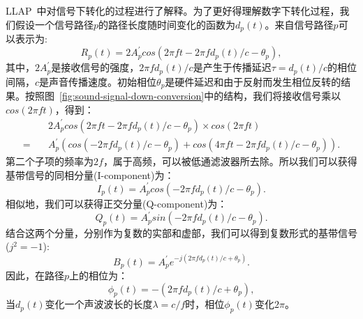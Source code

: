 LLAP~\cite{wang2016device}中对信号下转化的过程进行了解释。为了更好得理解数字下转化过程，我们假设一个信号路径$p$的路径长度随时间变化的函数为$d_p\left( t\right)$。来自信号路径$p$可以表示为:
$$
R_{p}\left( t\right) = 2A^{'}_{p}cos \left( 2\pi ft - 2\pi fd_{p}\left( t \right) / c - \theta_{p} \right),
$$
其中，$2A^{'}_{p}$是接收信号的强度，$2\pi fd_{p}\left( t \right)/c$是产生于传播延迟$\tau=d_{p}\left(t\right)/c$的相位间隔，$c$是声音传播速度。初始相位$\theta_p$是硬件延迟和由于反射而发生相位反转的结果。按照图~\ref{fig:sound-signal-down-conversion}中的结构，我们将接收信号乘以$cos\left( 2\pi ft \right)$，得到：
\begin{equation}\nonumber
\begin{aligned}
&2A_{p}^{'}cos \left( 2\pi ft - 2\pi fd_{p}\left( t\right)/c - \theta_{p} \right) \times cos\left( 2\pi ft\right) \\ 
= \quad &A_{p}^{'}\left( cos\left( -2\pi fd_{p}\left( t\right)/c - \theta_{p} \right) + cos\left( 4\pi ft - 2\pi fd_{p}\left( t\right)/c - \theta_{p} \right)  \right).
\end{aligned}
\end{equation}
第二个子项的频率为$2f$，属于高频，可以被低通滤波器所去除。所以我们可以获得基带信号的同相分量(I-component)为：
$$
I_{p}\left( t\right) = A_{p}^{'}cos \left( -2\pi fd_{p}\left( t\right)/c - \theta_{p} \right).
$$
相似地，我们可以获得正交分量(Q-component)为：
$$
Q_{p}\left( t\right)=A_{p}^{'}sin\left( -2\pi fd_{p}\left(t \right)/c - \theta_{p} \right).
$$
结合这两个分量，分别作为复数的实部和虚部，我们可以得到复数形式的基带信号($j^2=-1$):
$$
B_{p}\left( t\right) = A_{p}^{'}e^{-j\left( 2\pi fd_{p}\left( t\right)/c + \theta_{p} \right)}.
$$
因此，在路径$p$上的相位为：
$$
\phi_{p}\left( t\right) = -\left( 2\pi fd_{p}\left( t\right)/c + \theta_{p} \right),
$$当$d_{p}\left(t\right)$变化一个声波波长的长度$\lambda = c/f$时，相位$\phi_{p}\left( t\right)$变化$2\pi$。
